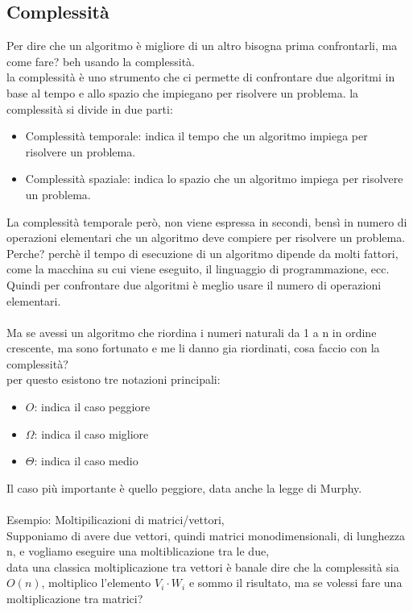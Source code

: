 \documentclass[a4paper,12pt]{article}
\begin{document}
\subsection{Complessità}
Per dire che un algoritmo è migliore di un altro bisogna prima confrontarli, ma come fare? beh usando la complessità. \\
la complessità è uno strumento che ci permette di confrontare due algoritmi in base al tempo e allo spazio che impiegano per risolvere un problema.
la complessità si divide in due parti:
\begin{itemize}
    \item Complessità temporale: indica il tempo che un algoritmo impiega per risolvere un problema.
    \item Complessità spaziale: indica lo spazio che un algoritmo impiega per risolvere un problema.
\end{itemize}
La complessità temporale però, non viene espressa in secondi, bensì in numero di operazioni elementari che un algoritmo deve compiere per risolvere un problema. Perche? perchè il tempo di esecuzione di un algoritmo dipende da molti fattori, come la macchina su cui viene eseguito, il linguaggio di programmazione, ecc. Quindi per confrontare due algoritmi è meglio usare il numero di operazioni elementari.
\\
\\
Ma se avessi un algoritmo che riordina i numeri naturali da 1 a n in ordine crescente, ma sono fortunato e me li danno gia riordinati, cosa faccio con la complessità? \\
per questo esistono tre notazioni principali: 
\begin{itemize}
    \item $O$: indica il caso peggiore
    \item $\Omega$: indica il caso migliore
    \item $\Theta$: indica il caso medio
\end{itemize}
Il caso più importante è quello peggiore, data anche la legge di Murphy. 
\\
\\
{\textcolor{esempio}{Esempio: }}  Moltipilicazioni di matrici/vettori, \\ 
Supponiamo di avere due vettori, quindi matrici monodimensionali,  di lunghezza n, e vogliamo eseguire una moltiblicazione tra le due, \\
data una classica moltiplicazione tra vettori è banale dire che la complessità sia $O(n)$, moltiplico l'elemento $V_{i} \cdot W_{i}$ e sommo il risultato, ma se volessi fare una moltiplicazione tra matrici? \\ 
\end{document}
